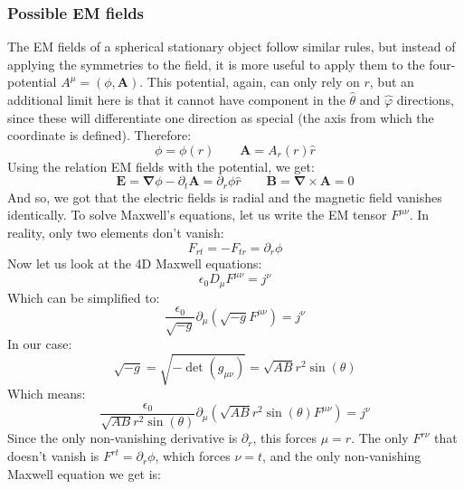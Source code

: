 \documentclass{article}
\begin{document}
\subsubsection{Possible EM fields}
The EM fields of a spherical stationary object follow similar rules, but instead of applying the symmetries to the field, it is more useful to apply them to the four-potential $A^\mu = (\phi, \boldsymbol{A})$. This potential, again, can only rely on $r$, but an additional limit here is that it cannot have component in the $\hat{\theta}$ and $\hat{\varphi}$ directions, since these will differentiate one direction as special (the axis from which the coordinate is defined). Therefore:
\begin{equation}
    \phi = \phi(r)
    \qquad
    \boldsymbol{A} = A_r(r)\hat{r}
\end{equation}
Using the relation EM fields with the potential, we get:
\begin{equation}
    \boldsymbol{E} = \boldsymbol{\nabla} \phi - \partial_t \boldsymbol{A} = \partial_r \phi \hat{r}
    \qquad
    \boldsymbol{B} = \boldsymbol{\nabla} \times \boldsymbol{A} = 0
\end{equation}
And so, we got that the electric fields is radial and the magnetic field vanishes identically.
\newline
To solve Maxwell's equations, let us write the EM tensor $F^{\mu\nu}$. In reality, only two elements don't vanish:
\begin{equation}
    F_{rt} = -F_{tr} = \partial_r \phi
\end{equation}
Now let us look at the 4D Maxwell equations:
\begin{equation}
    \epsilon_0 D_\mu F^{\mu\nu} = j^\nu
\end{equation}
Which can be simplified to:
\begin{equation}
    \frac{\epsilon_0}{\sqrt{-g}} \partial_\mu \left(\sqrt{-g} F^{\mu\nu}\right) = j^\nu
\end{equation}
In our case:
\begin{equation}
    \sqrt{-g} = \sqrt{-\det(g_{\mu\nu})} = \sqrt{AB}r^2\sin(\theta)
\end{equation}
Which means:
\begin{equation}
    \frac{\epsilon_0}{\sqrt{AB}r^2\sin(\theta)} \partial_\mu \left(\sqrt{AB}r^2\sin(\theta) F^{\mu\nu}\right) = j^\nu
\end{equation}
Since the only non-vanishing derivative is $\partial_r$, this forces $\mu = r$. The only $F^{r\nu}$ that doesn't vanish is $F^{rt} = \partial_r \phi$, which forces $\nu = t$, and the only non-vanishing Maxwell equation we get is:
\end{document}
